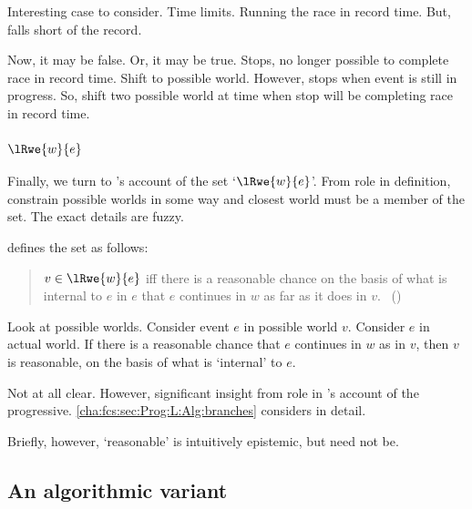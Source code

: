 \begin{note}
  Interesting case to consider.
  Time limits.
  Running the race in record time.
  But, falls short of the record.

  Now, it may be false.
  Or, it may be true.
  Stops, no longer possible to complete race in record time.
  Shift to possible world.
  However, stops when event is still in progress.
  So, shift two possible world at time when stop will be completing race in record time.
\end{note}

\subsubsection{\(\lRwe{w}{e}\)}

\begin{note}
  Finally, we turn to \citeauthor{Landman:1992wh}'s account of the set `\(\lRwe{w}{e}\)'.
  From role in definition, constrain possible worlds in some way and closest world must be a member of the set.
  The exact details are fuzzy.

  \citeauthor{Landman:1992wh} defines the set as follows:

  \begin{quote}
    \label{def:LandRwe}
    \(v \in \lRwe{w}{e}\) iff there is a reasonable chance on the basis of what is internal to \(e\) in \(e\) that \(e\) continues in \(w\) as far as it does in \(v\).%
    \mbox{ }\hfill\mbox{(\citeyear[26]{Landman:1992wh})}
  \end{quote}

  Look at possible worlds.
  Consider event \(e\) in possible world \(v\).
  Consider \(e\) in actual world.
  If there is a reasonable chance that \(e\) continues in \(w\) as in \(v\), then \(v\) is reasonable, on the basis of what is `internal' to \(e\).

  Not at all clear.
  However, significant insight from role in \citeauthor{Landman:1992wh}'s account of the progressive.
  \autoref{cha:fcs:sec:Prog:L:Alg:branches} considers in detail.

  Briefly, however, `reasonable' is intuitively epistemic, but need not be.
\end{note}

\subsection{An algorithmic variant}
\label{cha:fcs:sec:Prog:L:Alg}
\nocite{Cormen:2009uw}

